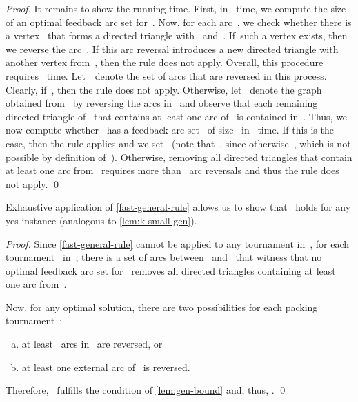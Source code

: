\documentclass[envcountsame,numbook,smallextended]{svjour3}
\numberwithin{equation}{section}
\numberwithin{figure}{section}
\newcommand{\FASTGP}{\textsc{Feedback Arc Set in Tournaments with  Cost- Packing}}
\begin{document}
\begin{proof}
  It remains to show the running time.
  First,
  in ~time,
  we compute the size~
  of an optimal feedback arc set for~.
  Now,
  for each arc~,
  we check whether there is a vertex~
  that forms a directed triangle
  with~ and~.
  If~such a vertex exists,
  then we reverse the arc~.
  If this arc reversal introduces a new directed triangle
  with another vertex from~,
  then the rule does not apply.
  Overall, this procedure requires~ time.
  Let~~denote the set of arcs that are reversed in this process. Clearly, if~, then the rule does not apply. Otherwise, let ~denote the graph obtained from~ by reversing the arcs in~ and observe that each remaining directed triangle of~ that contains at least one arc of~ is contained in~.
  Thus, we now compute whether~ has a feedback arc set~ of size~ in~ time. If this is the case, then the rule applies
  and we set~ (note that~, since otherwise~, which is not possible by definition of~).
  Otherwise, removing all directed triangles that contain at least one arc from~ requires more than~ arc reversals and thus the rule does not apply.
\qed\end{proof}

\noindent Exhaustive application of \cref{fast-general-rule} allows us to show that~ holds for any yes-instance (analogous to \cref{lem:k-small-gen}).


\begin{proof}
  Since \cref{fast-general-rule} cannot be applied
  to any tournament in~,
  for each tournament~ in~,
  there is a set of arcs
  between~ and~
  that witness that
  no optimal feedback arc set for~
  removes all directed triangles
  containing at least one arc from~.
  
  Now, for any optimal solution,
  there are two possibilities
  for each packing tournament~:
  \begin{enumerate}[(a)]
  \item\label{fast-inside} at least~ arcs in~ are reversed, or
  \item\label{fast-outside} at least one external arc of~ is reversed.
  \end{enumerate}
  Therefore, ~fulfills the condition
  of \cref{lem:gen-bound}
  and, thus,
  .
\qed\end{proof}
\end{document}
